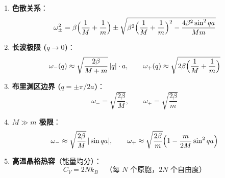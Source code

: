\begin{formulabox}[核心公式]
\begin{enumerate}[label=\textbf{(\arabic*)}]
    \item \textbf{色散关系}：
    \[
    \omega_{\pm}^2 = \beta\Bigl(\frac{1}{M}+\frac{1}{m}\Bigr)
    \pm\sqrt{\beta^2\Bigl(\frac{1}{M}+\frac{1}{m}\Bigr)^2-\frac{4\beta^2\sin^2 qa}{Mm}}
    \]

    \item \textbf{长波极限 ($q\to0$)}：
    \[
    \omega_{-}(q)\approx\sqrt{\frac{2\beta}{M+m}}\,|q|\cdot a,\qquad
    \omega_{+}(q)\approx\sqrt{2\beta\Bigl(\frac{1}{M}+\frac{1}{m}\Bigr)}
    \]

    \item \textbf{布里渊区边界 ($q=\pm\pi/2a$)}：
    \[
    \omega_{-}=\sqrt{\frac{2\beta}{M}},\qquad \omega_{+}=\sqrt{\frac{2\beta}{m}}
    \]

    \item \textbf{$M\gg m$ 极限}：
    \[
    \omega_{-}\approx\sqrt{\frac{2\beta}{M}}\,|\sin qa|,\qquad
    \omega_{+}\approx\sqrt{\frac{2\beta}{m}}\Bigl(1-\frac{m}{2M}\sin^2 qa\Bigr)
    \]

    \item \textbf{高温晶格热容}（能量均分）：
    \[
    C_V = 2Nk_B\quad\text{（每 $N$ 个原胞，$2N$ 个自由度）}
    \]
\end{enumerate}
\end{formulabox}

